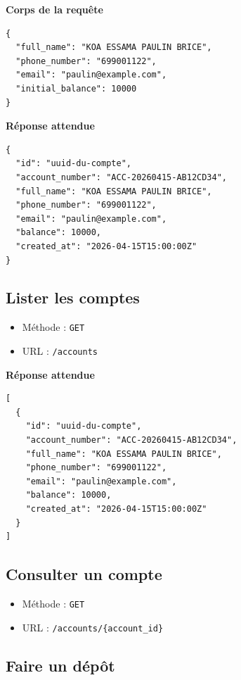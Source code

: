 \documentclass[12pt,a4paper]{article}
\begin{document}
\textbf{Corps de la requête}

\begin{verbatim}
{
  "full_name": "KOA ESSAMA PAULIN BRICE",
  "phone_number": "699001122",
  "email": "paulin@example.com",
  "initial_balance": 10000
}
\end{verbatim}

\textbf{Réponse attendue}

\begin{verbatim}
{
  "id": "uuid-du-compte",
  "account_number": "ACC-20260415-AB12CD34",
  "full_name": "KOA ESSAMA PAULIN BRICE",
  "phone_number": "699001122",
  "email": "paulin@example.com",
  "balance": 10000,
  "created_at": "2026-04-15T15:00:00Z"
}
\end{verbatim}

\subsection{Lister les comptes}

\begin{itemize}
    \item Méthode : \texttt{GET}
    \item URL : \texttt{/accounts}
\end{itemize}

\textbf{Réponse attendue}

\begin{verbatim}
[
  {
    "id": "uuid-du-compte",
    "account_number": "ACC-20260415-AB12CD34",
    "full_name": "KOA ESSAMA PAULIN BRICE",
    "phone_number": "699001122",
    "email": "paulin@example.com",
    "balance": 10000,
    "created_at": "2026-04-15T15:00:00Z"
  }
]
\end{verbatim}

\subsection{Consulter un compte}

\begin{itemize}
    \item Méthode : \texttt{GET}
    \item URL : \texttt{/accounts/\{account\_id\}}
\end{itemize}

\subsection{Faire un dépôt}
\end{document}
